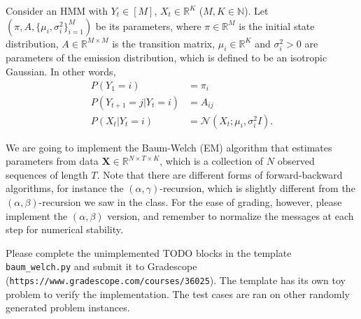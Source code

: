 \documentclass[12pt]{article} \usepackage[utf8]{inputenc}
\newcommand{\Ncal}{\mathcal{N}}
\begin{document}
\begin{figure}[h]
\centering
{}
\end{figure}

Consider an HMM with $ Y_t \in [M] $, $ X_t \in \mathbb{R}^{K} $ ($ M, K \in \mathbb{N} $).
Let $ (\pi, A, \{\mu_i, \sigma_i^2\}_{i=1}^M) $ be its parameters, where $ \pi \in \mathbb{R}^{M} $ is the initial state distribution, $ A \in \mathbb{R}^{M \times M} $ is the transition matrix, $ \mu_i \in \mathbb{R}^{K} $ and $ \sigma_i^2 > 0 $ are parameters of the emission distribution, which is defined to be an isotropic Gaussian. 
In other words,
\begin{align}
P(Y_1 = i) & = \pi_{i} \\
P(Y_{t+1} = j | Y_t = i) & = A_{ij} \\
P(X_t | Y_t = i) & = \Ncal(X_t; \mu_i, \sigma_i^2 I).
\end{align}


We are going to implement the Baum-Welch (EM) algorithm that estimates parameters from data $ \boldsymbol{X} \in \mathbb{R}^{N \times T \times K} $, which is a collection of $ N $ observed sequences of length $ T $. 
Note that there are different forms of forward-backward algorithms, for instance the $ (\alpha,\gamma) $-recursion, which is slightly different from the $ (\alpha,\beta)$-recursion we saw in the class. 
For the ease of grading, however, please implement the $ (\alpha,\beta) $ version, and remember to normalize the messages at each step for numerical stability.


Please complete the unimplemented TODO blocks in the template \verb|baum_welch.py| and submit it to Gradescope (\verb|https://www.gradescope.com/courses/36025|).
The template has its own toy problem to verify the implementation. 
The test cases are ran on other randomly generated problem instances.



\newpage


\end{document}
